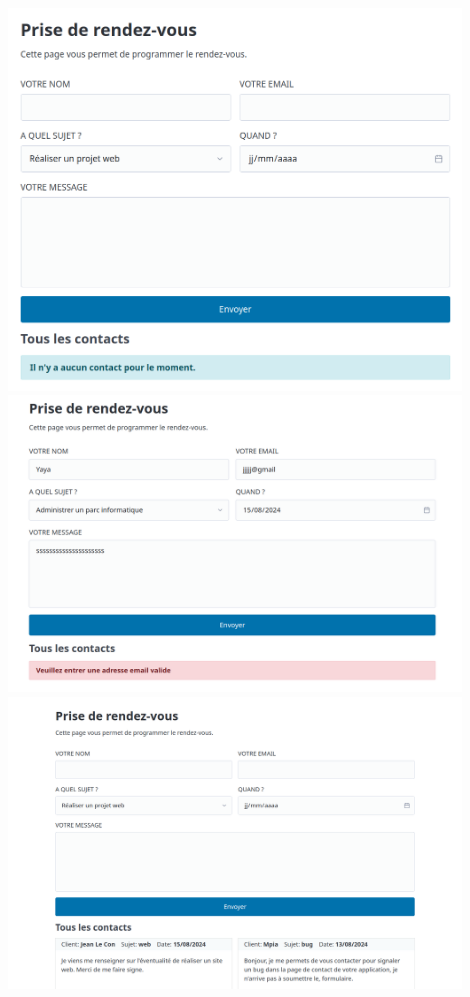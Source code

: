 \documentclass[a4paper,11pt]{article}
\begin{document}
                \includegraphics[width=0.9\textwidth]{CHAPITRE-5/5.2-BONUS/screenshots/screen1.png}\\
                \includegraphics[width=0.9\textwidth]{CHAPITRE-5/5.2-BONUS/screenshots/screen2.png}\\
                \includegraphics[width=0.9\textwidth]{CHAPITRE-5/5.2-BONUS/screenshots/screen3.png}\\
\end{document}
